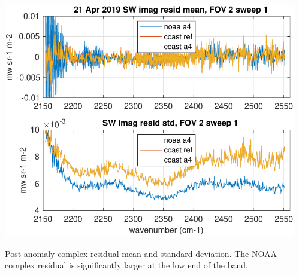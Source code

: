 \documentclass[10pt]{beamer}
\begin{document}
\begin{frame}
\begin{columns}[t]
\begin{column}{0.5\textwidth}
\end{column}
\begin{column}{0.5\textwidth}  
  \begin{centering}
  \includegraphics[width=\textwidth]{figures/SW_MW_fail_imag_fov2_sd1.pdf}
  \end{centering}\vspace{3mm}
  Post-anomaly complex residual mean and standard deviation.  The
  NOAA complex residual is significantly larger at the low end of
  the band.

\end{column}
\end{columns}
\end{frame}
\end{document}
